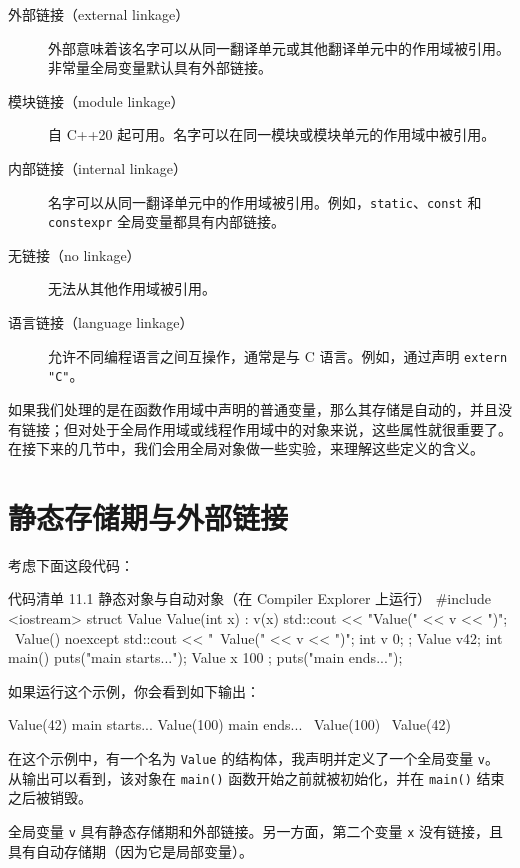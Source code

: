 \begin{description}
\item[外部链接（external linkage）] 外部意味着该名字可以从同一翻译单元或其他翻译单元中的作用域被引用。非常量全局变量默认具有外部链接。
\item[模块链接（module linkage）] 自 C++20 起可用。名字可以在同一模块或模块单元的作用域中被引用。
\item[内部链接（internal linkage）] 名字可以从同一翻译单元中的作用域被引用。例如，\texttt{static}、\texttt{const} 和 \texttt{constexpr} 全局变量都具有内部链接。
\item[无链接（no linkage）] 无法从其他作用域被引用。
\item[语言链接（language linkage）] 允许不同编程语言之间互操作，通常是与 C 语言。例如，通过声明 \texttt{extern "C"}。
\end{description}

如果我们处理的是在函数作用域中声明的普通变量，那么其存储是自动的，并且没有链接；但对处于全局作用域或线程作用域中的对象来说，这些属性就很重要了。在接下来的几节中，我们会用全局对象做一些实验，来理解这些定义的含义。

\section{静态存储期与外部链接}

考虑下面这段代码：

\begin{codeboxt}[cpp]{代码清单 11.1 静态对象与自动对象（在 Compiler Explorer 上运行）}
#include <iostream>
struct Value {
Value(int x) : v(x) { std::cout << "Value(" << v << ")\n"; }
~Value() noexcept { std::cout << "~Value(" << v << ")\n"; }
int v {0};
};
Value v{42};
int main() {
puts("main starts...");
Value x { 100 };
puts("main ends...");
}
\end{codeboxt}

如果运行这个示例，你会看到如下输出：

\begin{codebox}[cpp]
Value(42)
main starts...
Value(100)
main ends...
~Value(100)
~Value(42)
\end{codebox}

在这个示例中，有一个名为 \texttt{Value} 的结构体，我声明并定义了一个全局变量 \texttt{v}。从输出可以看到，该对象在 \texttt{main()} 函数开始之前就被初始化，并在 \texttt{main()} 结束之后被销毁。

全局变量 \texttt{v} 具有静态存储期和外部链接。另一方面，第二个变量 \texttt{x} 没有链接，且具有自动存储期（因为它是局部变量）。


